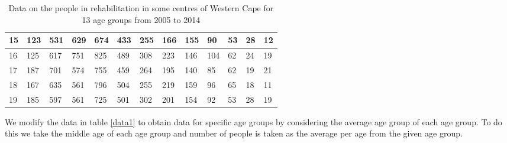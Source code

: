 \begin{table}[h!]
\begin{tabular}{|l|l|l|l|l|l|l|l|l|l|l|l|l|}
15& 123 &531&629 & 674  &433&255&166 &155   &90&53&28 &12 \\ \hline 
16&  125&617&751 &825   &489&308&223 &146   &104&62&24 &19   \\ \hline
17&187&701&574 &755   &459&264&195 &140   &85&62&19 &21 \\ \hline
18& 167&635&561 &796   &504&255&219 &159   &96&65&18 &11 \\ \hline
19& 185&597&561 &725   &501&302&201 &154   &92&53&28 &19   \\ \hline
\end{tabular}
\caption{Data on the people in rehabilitation in some centres of Western Cape for 13 age groups from 2005 to 2014}
\end{table} 


We modify the data in table \ref{data1} to obtain data for specific age groups by considering the average age group of each age group. To do this we take the middle age of each age group and number of people is taken as the average per age from the given age group.

